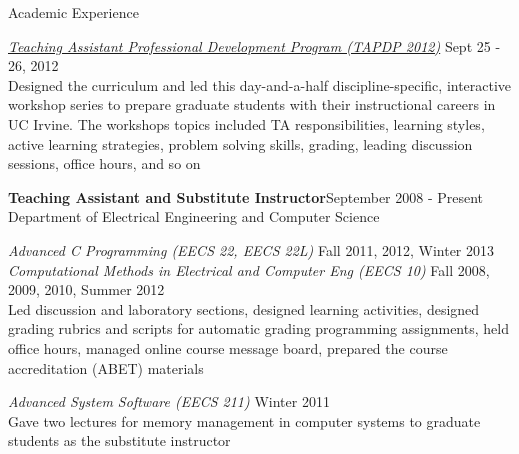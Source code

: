 \documentclass{resume} %
\begin{document}
\begin{rSection}{Academic Experience}
\begin{itemize}
{\item  \hyperref{http://www.cecs.uci.edu/~weiweic/teaching.html}{}{}{\textit{Teaching Assistant Professional Development Program (TAPDP 2012)}}   \hfill{Sept 25 - 26, 2012}\\
Designed the curriculum and led this day-and-a-half discipline-specific, interactive workshop series to prepare graduate students with their instructional careers in UC Irvine. The workshops topics included TA responsibilities, learning styles, active learning strategies, problem solving skills, grading, leading discussion sessions, office hours, and so on
}
\end{itemize}

\textbf{Teaching Assistant and Substitute Instructor}\hfill{September 2008 - Present}\\
{Department of Electrical Engineering and Computer Science}
\begin{itemize}
{\small
\item  \textit{Advanced C Programming (EECS 22, EECS 22L)} \hfill{Fall 2011, 2012, Winter 2013} \\
 \textit{Computational Methods in Electrical and Computer Eng (EECS 10)} \hfill{Fall 2008, 2009, 2010, Summer 2012} \\
Led discussion and laboratory sections, designed learning activities, designed grading rubrics and scripts for automatic grading programming assignments, held office hours, managed online course message board, prepared the course accreditation (ABET) materials

\item  \textit{Advanced System Software (EECS 211)} \hfill{Winter 2011} \\
Gave two lectures for memory management in computer systems to graduate students as the substitute instructor
}
\end{itemize}



\end{rSection}
\end{document}
